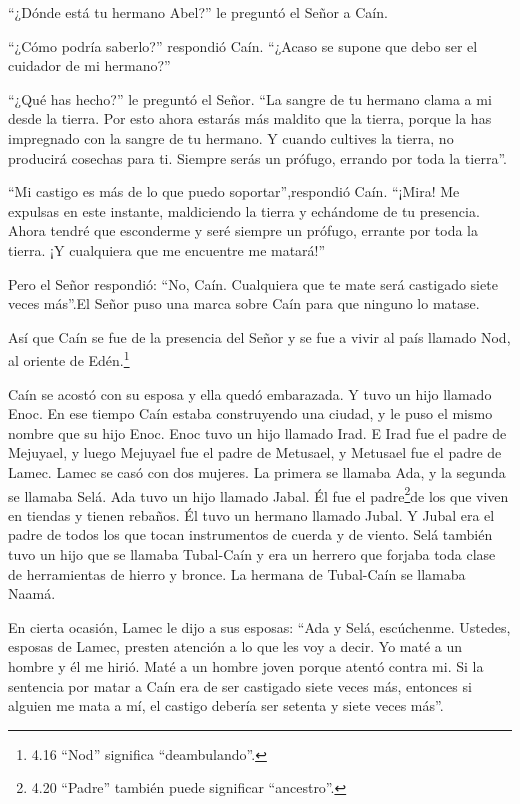  ``¿Dónde está tu hermano Abel?'' le preguntó el Señor a
Caín.

``¿Cómo podría saberlo?'' respondió Caín. ``¿Acaso se supone que debo
ser el cuidador de mi hermano?''

 ``¿Qué has hecho?'' le preguntó el Señor. ``La sangre de
tu hermano clama a mi desde la tierra.  Por esto ahora
estarás más maldito que la tierra, porque la has impregnado con la
sangre de tu hermano.  Y cuando cultives la tierra, no
producirá cosechas para ti. Siempre serás un prófugo, errando por toda
la tierra''.

 ``Mi castigo es más de lo que puedo soportar'',respondió
Caín.  ``¡Mira! Me expulsas en este instante, maldiciendo
la tierra y echándome de tu presencia. Ahora tendré que esconderme y
seré siempre un prófugo, errante por toda la tierra. ¡Y cualquiera que
me encuentre me matará!''

 Pero el Señor respondió: ``No, Caín. Cualquiera que te
mate será castigado siete veces más''.El Señor puso una marca sobre Caín
para que ninguno lo matase.

 Así que Caín se fue de la presencia del Señor y se fue a
vivir al país llamado Nod, al oriente de Edén.\footnote{4.16 ``Nod''
  significa ``deambulando''.}

 Caín se acostó con su esposa y ella quedó embarazada. Y
tuvo un hijo llamado Enoc. En ese tiempo Caín estaba construyendo una
ciudad, y le puso el mismo nombre que su hijo Enoc.  Enoc
tuvo un hijo llamado Irad. E Irad fue el padre de Mejuyael, y luego
Mejuyael fue el padre de Metusael, y Metusael fue el padre de Lamec.
 Lamec se casó con dos mujeres. La primera se llamaba Ada,
y la segunda se llamaba Selá.  Ada tuvo un hijo llamado
Jabal. Él fue el padre\footnote{4.20 ``Padre'' también puede significar
  ``ancestro''.}de los que viven en tiendas y tienen rebaños.
 Él tuvo un hermano llamado Jubal. Y Jubal era el padre de
todos los que tocan instrumentos de cuerda y de viento. 
Selá también tuvo un hijo que se llamaba Tubal-Caín y era un herrero que
forjaba toda clase de herramientas de hierro y bronce. La hermana de
Tubal-Caín se llamaba Naamá.

 En cierta ocasión, Lamec le dijo a sus esposas: ``Ada y
Selá, escúchenme. Ustedes, esposas de Lamec, presten atención a lo que
les voy a decir. Yo maté a un hombre y él me hirió. Maté a un hombre
joven porque atentó contra mi.  Si la sentencia por matar a
Caín era de ser castigado siete veces más, entonces si alguien me mata a
mí, el castigo debería ser setenta y siete veces más''.

